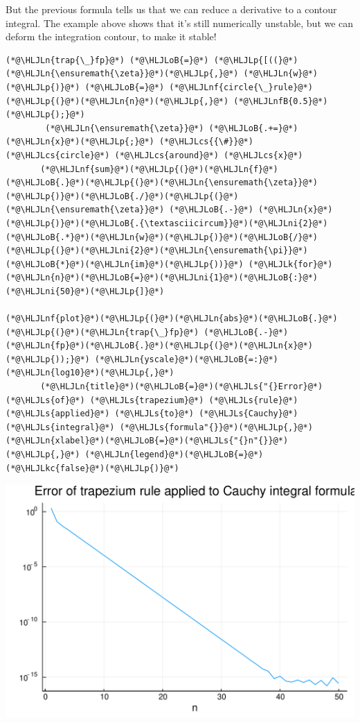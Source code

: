 \documentclass[12pt,a4paper]{article}
\newcommand{\HLJLk}[1]{\textcolor[RGB]{148,91,176}{\textbf{#1}}}
\newcommand{\HLJLkc}[1]{\textcolor[RGB]{59,151,46}{\textit{#1}}}
\newcommand{\HLJLn}[1]{#1}
\newcommand{\HLJLnf}[1]{\textcolor[RGB]{66,102,213}{#1}}
\newcommand{\HLJLs}[1]{\textcolor[RGB]{201,61,57}{#1}}
\newcommand{\HLJLnfB}[1]{\textcolor[RGB]{59,151,46}{#1}}
\newcommand{\HLJLni}[1]{\textcolor[RGB]{59,151,46}{#1}}
\newcommand{\HLJLoB}[1]{\textcolor[RGB]{102,102,102}{\textbf{#1}}}
\newcommand{\HLJLp}[1]{#1}
\newcommand{\HLJLcs}[1]{\textcolor[RGB]{153,153,119}{\textit{#1}}}
\begin{document}
But the previous formula tells us that we can reduce a derivative to a contour integral.   The example above shows that it's still numerically unstable, but we can deform the integration contour, to make it stable! 


\begin{lstlisting}
(*@\HLJLn{trap{\_}fp}@*) (*@\HLJLoB{=}@*) (*@\HLJLp{[((}@*)(*@\HLJLn{\ensuremath{\zeta}}@*)(*@\HLJLp{,}@*) (*@\HLJLn{w}@*)(*@\HLJLp{)}@*) (*@\HLJLoB{=}@*) (*@\HLJLnf{circle{\_}rule}@*)(*@\HLJLp{(}@*)(*@\HLJLn{n}@*)(*@\HLJLp{,}@*) (*@\HLJLnfB{0.5}@*)(*@\HLJLp{);}@*) 
        (*@\HLJLn{\ensuremath{\zeta}}@*) (*@\HLJLoB{.+=}@*) (*@\HLJLn{x}@*)(*@\HLJLp{;}@*) (*@\HLJLcs{{\#}}@*) (*@\HLJLcs{circle}@*) (*@\HLJLcs{around}@*) (*@\HLJLcs{x}@*)
       (*@\HLJLnf{sum}@*)(*@\HLJLp{(}@*)(*@\HLJLn{f}@*)(*@\HLJLoB{.}@*)(*@\HLJLp{(}@*)(*@\HLJLn{\ensuremath{\zeta}}@*)(*@\HLJLp{)}@*)(*@\HLJLoB{./}@*)(*@\HLJLp{(}@*)(*@\HLJLn{\ensuremath{\zeta}}@*) (*@\HLJLoB{.-}@*) (*@\HLJLn{x}@*)(*@\HLJLp{)}@*)(*@\HLJLoB{.{\textasciicircum}}@*)(*@\HLJLni{2}@*) (*@\HLJLoB{.*}@*)(*@\HLJLn{w}@*)(*@\HLJLp{)}@*)(*@\HLJLoB{/}@*)(*@\HLJLp{(}@*)(*@\HLJLni{2}@*)(*@\HLJLn{\ensuremath{\pi}}@*)(*@\HLJLoB{*}@*)(*@\HLJLn{im}@*)(*@\HLJLp{))}@*) (*@\HLJLk{for}@*) (*@\HLJLn{n}@*)(*@\HLJLoB{=}@*)(*@\HLJLni{1}@*)(*@\HLJLoB{:}@*)(*@\HLJLni{50}@*)(*@\HLJLp{]}@*)

(*@\HLJLnf{plot}@*)(*@\HLJLp{(}@*)(*@\HLJLn{abs}@*)(*@\HLJLoB{.}@*)(*@\HLJLp{(}@*)(*@\HLJLn{trap{\_}fp}@*) (*@\HLJLoB{.-}@*) (*@\HLJLn{fp}@*)(*@\HLJLoB{.}@*)(*@\HLJLp{(}@*)(*@\HLJLn{x}@*)(*@\HLJLp{));}@*) (*@\HLJLn{yscale}@*)(*@\HLJLoB{=:}@*)(*@\HLJLn{log10}@*)(*@\HLJLp{,}@*) 
       (*@\HLJLn{title}@*)(*@\HLJLoB{=}@*)(*@\HLJLs{"{}Error}@*) (*@\HLJLs{of}@*) (*@\HLJLs{trapezium}@*) (*@\HLJLs{rule}@*) (*@\HLJLs{applied}@*) (*@\HLJLs{to}@*) (*@\HLJLs{Cauchy}@*) (*@\HLJLs{integral}@*) (*@\HLJLs{formula"{}}@*)(*@\HLJLp{,}@*) (*@\HLJLn{xlabel}@*)(*@\HLJLoB{=}@*)(*@\HLJLs{"{}n"{}}@*)(*@\HLJLp{,}@*) (*@\HLJLn{legend}@*)(*@\HLJLoB{=}@*)(*@\HLJLkc{false}@*)(*@\HLJLp{)}@*)
\end{lstlisting}

\includegraphics[width=\linewidth]{figures/Lecture6_7_1.pdf}
\end{document}
